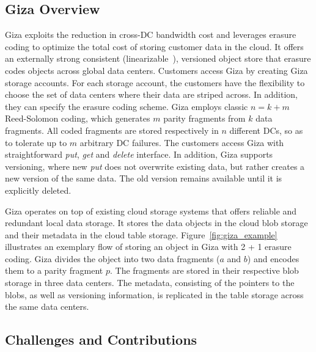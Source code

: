 \subsection{Giza Overview}

Giza exploits the reduction in cross-DC bandwidth cost
and leverages erasure coding to optimize the total cost of storing customer data in the cloud.
It offers an externally strong consistent (linearizable~\cite{herlihy90linearizability}),
versioned object store that erasure codes objects across global data centers.
Customers access Giza by creating Giza storage accounts. For each storage
account, the customers have the flexibility to choose the set of data centers
where their data are striped across. In addition, they can specify the erasure coding scheme.
Giza employs classic $n = k + m$ Reed-Solomon coding, which generates $m$ parity fragments from $k$ data fragments.
All coded fragments are stored respectively in $n$ different DCs,
so as to tolerate up to $m$ arbitrary DC failures.
The customers access Giza with straightforward {\em put}, {\em get} and {\em delete} interface. In addition, Giza supports versioning, where new {\em put} does not overwrite existing data, but rather creates a new version of the same data. The old version remains available until it is explicitly deleted.

Giza operates on top of existing cloud storage systems that offers reliable and redundant local data storage. It stores the data
objects in the cloud blob storage and their metadata in the cloud table
storage. Figure~\ref{fig:giza_example} illustrates an exemplary flow of storing
an object in Giza with 2 + 1 erasure coding.
Giza divides the object into two data fragments ($a$ and $b$) and encodes them to a parity fragment $p$.
The fragments are stored in their respective blob storage in three data centers. The metadata, consisting of the pointers to the
blobs, as well as versioning information, is replicated in the table storage across the
same data centers.

\subsection{Challenges and Contributions}

